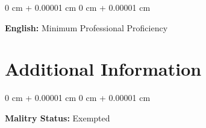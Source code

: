\documentclass[10pt, letterpaper]{article}
\newenvironment{onecolentry}{
    \begin{adjustwidth}{
        0 cm + 0.00001 cm
    }{
        0 cm + 0.00001 cm
    }
}{
    \end{adjustwidth}
} %
\begin{document}
        \vspace{0.2 cm}

        \begin{onecolentry}
            \textbf{English:} Minimum Professional Proficiency
        \end{onecolentry}


    
    \section{Additional Information}



        
        \begin{onecolentry}
            \textbf{Malitry Status:} Exempted
        \end{onecolentry}


    
\end{document}
